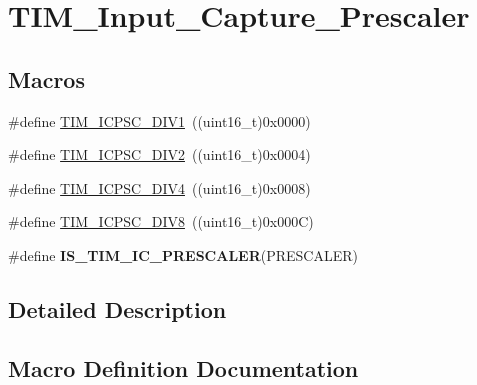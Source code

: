 \hypertarget{group___t_i_m___input___capture___prescaler}{}\section{T\+I\+M\+\_\+\+Input\+\_\+\+Capture\+\_\+\+Prescaler}
\label{group___t_i_m___input___capture___prescaler}
\subsection*{Macros}
\begin{DoxyCompactItemize}
\item 
\#define \hyperlink{group___t_i_m___input___capture___prescaler_ga8acb44abe3147d883685c1f9f1ce410e}{T\+I\+M\+\_\+\+I\+C\+P\+S\+C\+\_\+\+D\+I\+V1}~((uint16\+\_\+t)0x0000)
\item 
\#define \hyperlink{group___t_i_m___input___capture___prescaler_ga1d8a7b66add914e2ddd910d2d700978f}{T\+I\+M\+\_\+\+I\+C\+P\+S\+C\+\_\+\+D\+I\+V2}~((uint16\+\_\+t)0x0004)
\item 
\#define \hyperlink{group___t_i_m___input___capture___prescaler_gaf5a675046430fa0f0c95b0dac612828f}{T\+I\+M\+\_\+\+I\+C\+P\+S\+C\+\_\+\+D\+I\+V4}~((uint16\+\_\+t)0x0008)
\item 
\#define \hyperlink{group___t_i_m___input___capture___prescaler_ga5086cb03c89a5c67b199d20b605f00cb}{T\+I\+M\+\_\+\+I\+C\+P\+S\+C\+\_\+\+D\+I\+V8}~((uint16\+\_\+t)0x000\+C)
\item 
\#define {\bfseries I\+S\+\_\+\+T\+I\+M\+\_\+\+I\+C\+\_\+\+P\+R\+E\+S\+C\+A\+L\+E\+R}(P\+R\+E\+S\+C\+A\+L\+E\+R)
\end{DoxyCompactItemize}


\subsection{Detailed Description}


\subsection{Macro Definition Documentation}
\hypertarget{group___t_i_m___input___capture___prescaler_ga91d219d7a210eb0a4bb49d72bda6b321}{}

